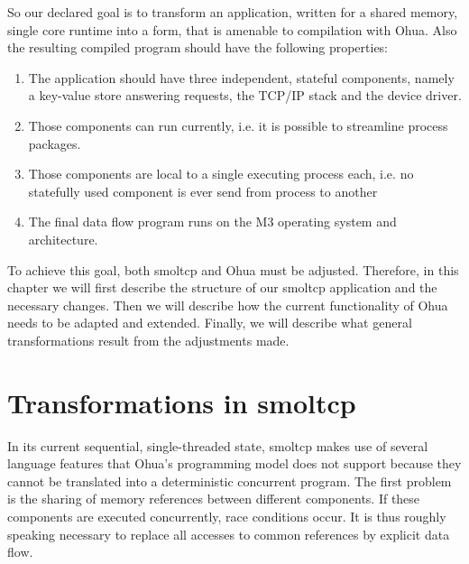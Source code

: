So our declared goal is to transform an application, written for a shared memory, single core runtime into a form, that is amenable to compilation with Ohua. Also the resulting compiled program should have the following properties:
\begin{enumerate}
    \item The application should have three independent, stateful components, namely a key-value store answering requests, the TCP/IP stack and the device driver. 
    \item Those components can run currently, i.e. it is possible to streamline process packages.
    \item Those components are local to a single executing process each, i.e. no statefully used component is ever send from process to another
    \item The final data flow program runs on the M3 operating system and architecture.
\end{enumerate}

To achieve this goal, both smoltcp and Ohua must be adjusted. Therefore, in this chapter we will first describe the structure of our smoltcp application and the necessary changes. Then we will describe how the current functionality of Ohua needs to be adapted and extended. Finally, we will describe what general transformations result from the adjustments made. 

\section{Transformations in smoltcp}
\label{sec:ImplSmoltcp}

In its current sequential, single-threaded state, smoltcp makes use of several language features that Ohua's programming model does not support because they cannot be translated into a deterministic concurrent program. The first problem is the sharing of memory references between different components. If these components are executed concurrently, race conditions occur. It is thus roughly speaking necessary to replace all accesses to common references by explicit data flow. 

